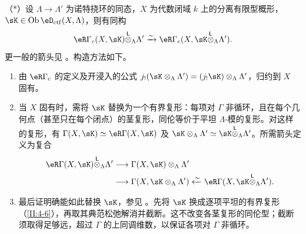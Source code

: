 \noindent（$*$）设 $\Lambda\to\Lambda'$ 为诺特挠环的同态，$X$ 为代数闭域 $k$ 上的分离有限型概形，$\sK\in\ob\eD_{\mathrm{ctf}}(X,\Lambda)$，则有同构
\[\eR\Gamma_c(X,\sK)\lotimes_\Lambda\Lambda'\iso\eR\Gamma_c(X,\sK\lotimes_\Lambda\Lambda').\]
更一般的箭头见 \cite[XVII 4.2.12]{sga4}。构造方法如下。
\begin{enumerate}[\indent a)]
\item 由 $\eR\Gamma_c$ 的定义及开浸入的公式 $j_!(\sK\otimes_\Lambda\Lambda')=(j_!\sK)\otimes_\Lambda\Lambda'$，归约到 $X$ 固有。
\item 当 $X$ 固有时，需将 $\sK$ 替换为一个有界复形：每项对 $\Gamma$ 非循环，且在每个几何点（甚至只在每个闭点）的茎复形，同伦等价于平坦 $\Lambda$-模的复形。对这样的复形，有 $\Gamma(X,\sK)\simeq\eR\Gamma(X,\sK)$ 及 $\sK\otimes_\Lambda\Lambda'\simeq\sK\lotimes_\Lambda\Lambda'$。所需箭头定义为复合
\begin{align*}
\eR\Gamma(X,\sK)\lotimes_\Lambda\Lambda'&\longrightarrow\Gamma(X,\sK)\otimes_\Lambda\Lambda'\\
&\longrightarrow\Gamma(X,\sK\otimes_\Lambda\Lambda')\xleftarrow{\sim}\eR\Gamma(X,\sK\lotimes_\Lambda\Lambda').
\end{align*}
\item 最后证明确能如此替换 $\sK$，参见 \cite[XVII 4.2.10]{sga4}。先将 $\sK$ 换成逐项平坦的有界复形（\ref{II:4-6}），再取其典范松弛解消并截断。这不改变各茎复形的同伦型；截断须取得足够远，超过 $\Gamma$ 的上同调维数，以保证各项对 $\Gamma$ 非循环。
\end{enumerate}

